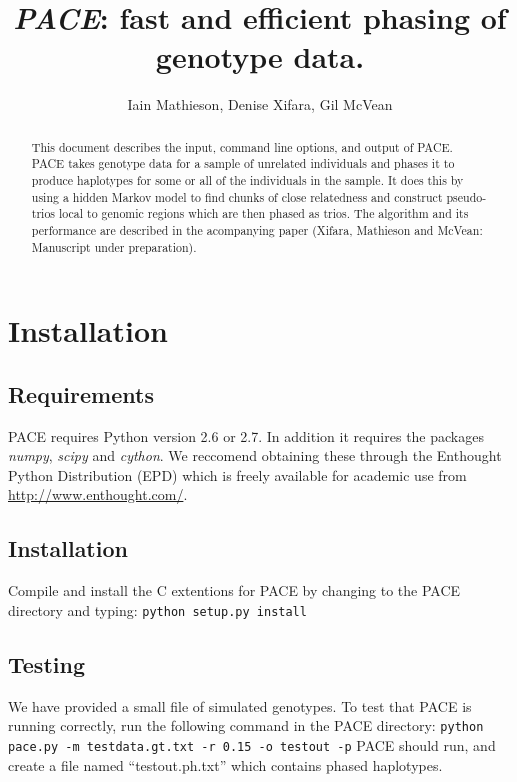 \documentclass[10pt]{refart}
\title{\emph{PACE}: fast and efficient phasing of genotype data.}
\author{Iain Mathieson, Denise Xifara, Gil McVean}
\begin{document}
\maketitle

\begin{abstract}
  This document describes the input, command line options, and output of PACE. PACE takes genotype data for a sample of unrelated individuals and phases it to produce haplotypes for some or all of the individuals in the sample. It does this by using a hidden Markov model to find chunks of close relatedness and construct pseudo-trios local to genomic regions which are then phased as trios. The algorithm and its performance are described in the acompanying paper (Xifara, Mathieson and McVean: Manuscript under preparation).
\end{abstract}

\newpage
\tableofcontents
\newpage

\section{Installation}
\subsection{Requirements}
PACE requires Python version 2.6 or 2.7. In addition it requires the packages \emph{numpy}, \emph{scipy} and \emph{cython}. We reccomend obtaining these through the Enthought Python Distribution (EPD) which is freely available for academic use from \url{http://www.enthought.com/}.

\subsection{Installation}
Compile and install the C extentions for PACE by changing to the PACE directory and typing:
\newline
\newline
\texttt{python setup.py install}

\subsection{Testing}
We have provided a small file of simulated genotypes. To test that PACE is running correctly, run the following command in the PACE directory:
\newline
\newline
\texttt{python pace.py -m testdata.gt.txt -r 0.15 -o testout -p}
\newline
\newline
PACE should run, and create a file named ``testout.ph.txt'' which contains phased haplotypes. 
\end{document}

